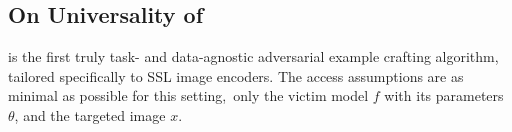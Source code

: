 \subsection{On Universality of \EmbedAttack}

\EmbedAttack is the first truly task- and data-agnostic adversarial example crafting algorithm, tailored specifically to SSL image encoders. The access assumptions are as minimal as possible for this setting,~\ie only the victim model $f$ with its parameters $\theta$, and the targeted image $x$. 